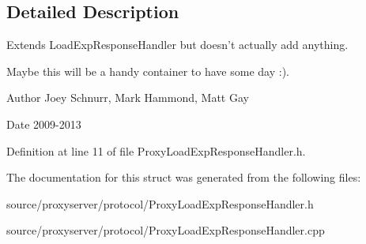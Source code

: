 \subsection{Detailed Description}
Extends Load\-Exp\-Response\-Handler but doesn't actually add anything. 

Maybe this will be a handy container to have some day \-:). \begin{DoxyAuthor}{Author}
Joey Schnurr, Mark Hammond, Matt Gay 
\end{DoxyAuthor}
\begin{DoxyDate}{Date}
2009-\/2013 
\end{DoxyDate}


Definition at line 11 of file Proxy\-Load\-Exp\-Response\-Handler.\-h.



The documentation for this struct was generated from the following files\-:\begin{DoxyCompactItemize}
\item 
source/proxyserver/protocol/Proxy\-Load\-Exp\-Response\-Handler.\-h\item 
source/proxyserver/protocol/Proxy\-Load\-Exp\-Response\-Handler.\-cpp\end{DoxyCompactItemize}
